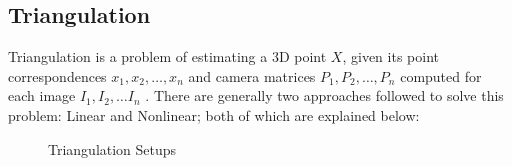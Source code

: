 \documentclass[11pt, a4paper, openany]{article}
\begin{document}
\subsection{Triangulation} Triangulation is a problem of estimating a 3D point $X$, given its point correspondences $x_{1}, x_{2}, \ldots , x_{n}$ and camera matrices $P_{1}, P_{2}, \ldots , P_{n}$ computed for each image $I_{1}, I_{2}, \ldots I_{n}$ \cite{triangulation}. There are generally two approaches followed to solve this problem: Linear and Nonlinear; both of which are explained below:
\begin{figure}[!ht]%
    \centering
    \qquad
    \caption{Triangulation Setups}%
    \label{fig:triangulation}%
\end{figure}
\end{document}
